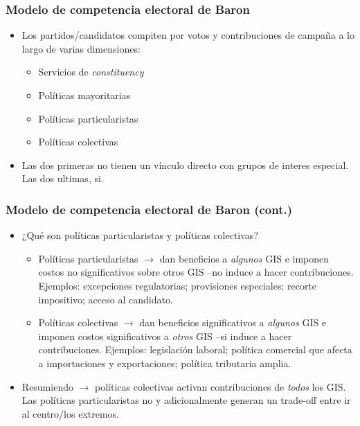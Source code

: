 \documentclass[14pt,aspectratio=169]{beamer}
\begin{document}
\begin{frame}\frametitle{Modelo de competencia electoral de Baron}
\begin{itemize}\itemsep 15pt
\item Los partidos/candidatos compiten por votos y contribuciones de
  campaña a lo largo de varias dimensiones:
\begin{itemize}\itemsep 15pt \medskip 
\item Servicios de \textit{constituency}
\item Políticas mayoritarias
\item Políticas particularistas
\item Políticas colectivas
\end{itemize}
\item Las dos primeras no tienen un vínculo directo con grupos de
  interes especial. Las dos ultimas, si. 
\end{itemize}
\end{frame}


\begin{frame}\frametitle{Modelo de competencia electoral de Baron
    (cont.)}
\begin{itemize}\itemsep 15pt 
\item ¿Qué son políticas particularistas y políticas colectivas?
\begin{itemize}\itemsep 15pt \medskip
\item Políticas particularistas $\longrightarrow$ dan beneficios a
  \textit{algunos} GIS e imponen costos no significativos sobre otros
  GIS --no induce a hacer contribuciones. Ejemplos: excepciones
  regulatorias; provisiones especiales; recorte impositivo; acceso al candidato. 
\item Políticas colectivas $\longrightarrow$ dan beneficios
   significativos a \textit{algunos} GIS e imponen costos
   significativos a \textit{otros} GIS --si induce a hacer
   contribuciones. Ejemplos: legislación laboral; política comercial
   que afecta a importaciones y exportaciones; política tributaria
   amplia. 
\end{itemize}
\item Resumiendo $\longrightarrow$ políticas colectivas activan
  contribuciones de \textit{todos} los GIS. Las políticas
  particularistas no y adicionalmente generan un trade-off entre
ir al centro/los extremos. 
\end{itemize}
\end{frame}
\end{document}
